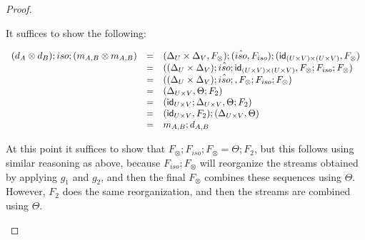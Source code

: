 \begin{proof}
\begin{report}
\begin{itemize}
    It suffices to show the following:
    \begin{center}
      \begin{math}
        \begin{array}{lll}
          (d_A \otimes d_B);iso;(m_{A,B} \otimes m_{A,B})
          & = & (\Delta_U \times \Delta_V,F_\otimes);(\hat{iso},F_{iso});(\mathsf{id}_{(U \times V) \times (U \times V)},F_\otimes)\\
          & = & ((\Delta_U \times \Delta_V);\hat{iso};\mathsf{id}_{(U \times V) \times (U \times V)},F_\otimes;F_{iso};F_\otimes)\\
          & = & ((\Delta_U \times \Delta_V);\hat{iso};,F_\otimes;F_{iso};F_\otimes)\\
          & = & (\Delta_{U \times V},\Theta;F_2)\\
          & = & (\mathsf{id}_{U \times V};\Delta_{U \times V},\Theta;F_2)\\
          & = & (\mathsf{id}_{U \times V},F_2);(\Delta_{U \times V},\Theta)\\
          & = & m_{A,B};d_{A,B}\\
        \end{array}
      \end{math}
    \end{center}
    At this point it suffices to show that
    $F_\otimes;F_{iso};F_\otimes = \Theta;F_2$, but this follows using
    similar reasoning as above, because $F_{iso};F_\otimes$ will
    reorganize the streams obtained by applying $g_1$ and $g_2$, and
    then the final $F_\otimes$ combines these sequences using $\Theta$.
    However, $F_2$ does the same reorganization, and then the streams
    are combined using $\Theta$.



\end{itemize}
\end{report}
\end{proof}
